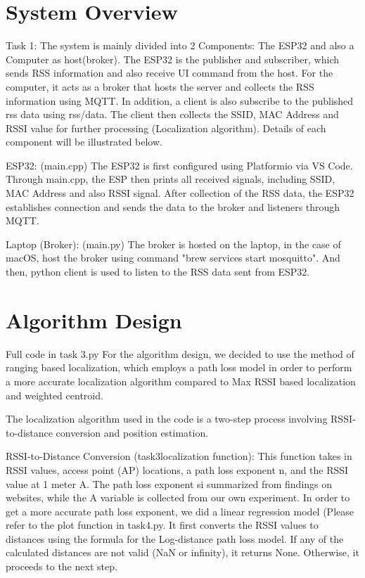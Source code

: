 \section{System Overview}
Task 1: The system is mainly divided into 2 Components: The ESP32 and also a Computer as host(broker). The ESP32 is the publisher and subscriber, which sends RSS information and also receive UI command from the host. For the computer, it acts as a broker that hosts the server and collects the RSS information using MQTT. In addition, a client is also subscribe to the published rss data using rss/data. The client then collects the SSID, MAC Address and RSSI value for further processing (Localization algorithm). Details of each component will be illustrated below.

ESP32: (main.cpp)
The ESP32 is first configured using Platformio via VS Code. Through main.cpp, the ESP then prints all received signals, including SSID, MAC Address and also RSSI signal. After collection of the RSS data, the ESP32 establishes connection and sends the data to the broker and listeners through MQTT. 

Laptop (Broker): (main.py)
The broker is hosted on the laptop, in the case of macOS, host the broker using command "brew services start mosquitto". And then, python client is used to listen to the RSS data sent from ESP32. 

\section{Algorithm Design}
Full code in task 3.py 
For the algorithm design, we decided to use the method of ranging based localization, which employs a path loss model in order to perform a more accurate localization algorithm compared to Max RSSI based localization and weighted centroid. 

The localization algorithm used in the code is a two-step process involving RSSI-to-distance conversion and position estimation. 

RSSI-to-Distance Conversion (task3localization function): This function takes in RSSI values, access point (AP) locations, a path loss exponent n, and the RSSI value at 1 meter A. The path loss exponent si summarized from findings on websites, while the A variable is collected from our own experiment. In order to get a more accurate path loss exponent, we did a linear regression model (Please refer to the plot function in task4.py. It first converts the RSSI values to distances using the formula for the Log-distance path loss model. If any of the calculated distances are not valid (NaN or infinity), it returns None. Otherwise, it proceeds to the next step.

